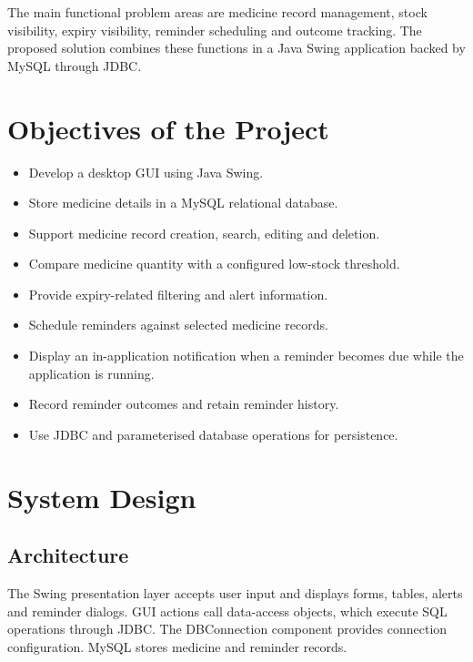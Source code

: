 \documentclass[12pt,a4paper,oneside]{report}
\begin{document}
The main functional problem areas are medicine record management, stock visibility, expiry visibility, reminder scheduling and outcome tracking. The proposed solution combines these functions in a Java Swing application backed by MySQL through JDBC.

\chapter{Objectives of the Project}
\begin{itemize}
\item Develop a desktop GUI using Java Swing.
\item Store medicine details in a MySQL relational database.
\item Support medicine record creation, search, editing and deletion.
\item Compare medicine quantity with a configured low-stock threshold.
\item Provide expiry-related filtering and alert information.
\item Schedule reminders against selected medicine records.
\item Display an in-application notification when a reminder becomes due while the application is running.
\item Record reminder outcomes and retain reminder history.
\item Use JDBC and parameterised database operations for persistence.
\end{itemize}

\chapter{System Design}
\section{Architecture}
The Swing presentation layer accepts user input and displays forms, tables, alerts and reminder dialogs. GUI actions call data-access objects, which execute SQL operations through JDBC. The DBConnection component provides connection configuration. MySQL stores medicine and reminder records.
\end{document}
